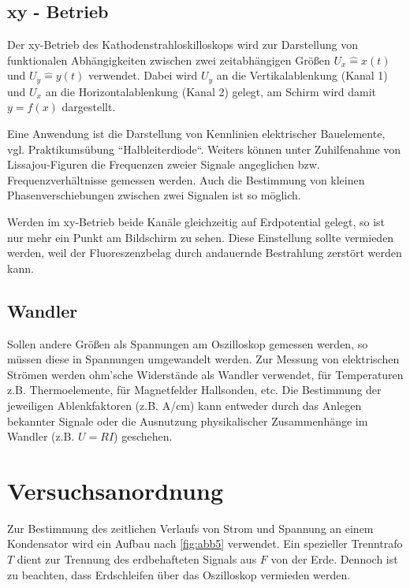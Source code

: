 \documentclass[11pt,ngerman]{scrartcl}
\begin{document}
\subsection{xy - Betrieb}

Der xy-Betrieb des Kathodenstrahloskilloskops wird zur Darstellung von funktionalen Abhängigkeiten
zwischen zwei zeitabhängigen Größen $U_x \hat{=} x(t)$ und $U_y \hat{=} y(t)$ verwendet. Dabei wird
$U_y$ an die Vertikalablenkung (Kanal 1) und $U_x$ an die Horizontalablenkung (Kanal 2) gelegt, am
Schirm wird damit $y = f(x)$ dargestellt.

Eine Anwendung ist die Darstellung von Kennlinien elektrischer Bauelemente, vgl. Praktikumsübung
``Halbleiterdiode``. Weiters können unter Zuhilfenahme von Lissajou-Figuren die
Frequenzen zweier Signale angeglichen bzw. Frequenzverhältnisse gemessen werden. Auch die
Bestimmung von kleinen Phasenverschiebungen zwischen zwei Signalen ist so möglich.

Werden im xy-Betrieb beide Kanäle gleichzeitig auf Erdpotential gelegt, so ist nur mehr ein
Punkt am Bildschirm zu sehen. Diese Einstellung sollte vermieden werden, weil der Fluoreszenzbelag
durch andauernde Bestrahlung zerstört werden kann.

\subsection{Wandler}

Sollen andere Größen als Spannungen am Oszilloskop gemessen werden, so müssen diese in
Spannungen umgewandelt werden. Zur Messung von elektrischen Strömen werden ohm’sche
Widerstände als Wandler verwendet, für Temperaturen z.B. Thermoelemente, für Magnetfelder
Hallsonden, etc. Die Bestimmung der jeweiligen Ablenkfaktoren (z.B. A/cm) kann entweder
durch das Anlegen bekannter Signale oder die Ausnutzung physikalischer Zusammenhänge im
Wandler (z.B. $U = RI$) geschehen.


\newpage

\section{Versuchsanordnung}\label{sec:Versuchsanordnung}

Zur Bestimmung des zeitlichen Verlaufs von Strom und Spannung an einem Kondensator wird ein
Aufbau nach \autoref{fig:abb5} verwendet. Ein spezieller Trenntrafo $T$ dient zur Trennung des erdbehafteten
Signals aus $F$ von der Erde. Dennoch ist zu beachten, dass Erdschleifen über das Oszilloskop
vermieden werden.
\end{document}
